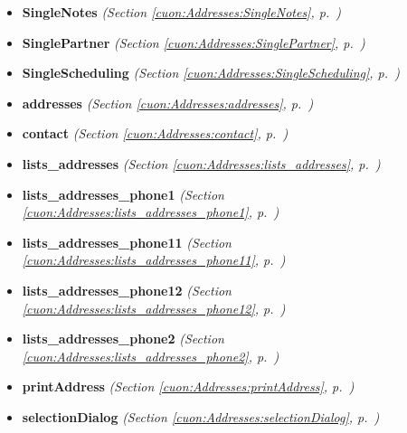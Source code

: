 \begin{itemize}
\begin{itemize}
    \item \textbf{SingleNotes}
  \textit{(Section \ref{cuon:Addresses:SingleNotes}, p.~\pageref{cuon:Addresses:SingleNotes})}

    \item \textbf{SinglePartner}
  \textit{(Section \ref{cuon:Addresses:SinglePartner}, p.~\pageref{cuon:Addresses:SinglePartner})}

    \item \textbf{SingleScheduling}
  \textit{(Section \ref{cuon:Addresses:SingleScheduling}, p.~\pageref{cuon:Addresses:SingleScheduling})}

    \item \textbf{addresses}
  \textit{(Section \ref{cuon:Addresses:addresses}, p.~\pageref{cuon:Addresses:addresses})}

    \item \textbf{contact}
  \textit{(Section \ref{cuon:Addresses:contact}, p.~\pageref{cuon:Addresses:contact})}

    \item \textbf{lists\_addresses}
  \textit{(Section \ref{cuon:Addresses:lists_addresses}, p.~\pageref{cuon:Addresses:lists_addresses})}

    \item \textbf{lists\_addresses\_phone1}
  \textit{(Section \ref{cuon:Addresses:lists_addresses_phone1}, p.~\pageref{cuon:Addresses:lists_addresses_phone1})}

    \item \textbf{lists\_addresses\_phone11}
  \textit{(Section \ref{cuon:Addresses:lists_addresses_phone11}, p.~\pageref{cuon:Addresses:lists_addresses_phone11})}

    \item \textbf{lists\_addresses\_phone12}
  \textit{(Section \ref{cuon:Addresses:lists_addresses_phone12}, p.~\pageref{cuon:Addresses:lists_addresses_phone12})}

    \item \textbf{lists\_addresses\_phone2}
  \textit{(Section \ref{cuon:Addresses:lists_addresses_phone2}, p.~\pageref{cuon:Addresses:lists_addresses_phone2})}

    \item \textbf{printAddress}
  \textit{(Section \ref{cuon:Addresses:printAddress}, p.~\pageref{cuon:Addresses:printAddress})}

    \item \textbf{selectionDialog}
  \textit{(Section \ref{cuon:Addresses:selectionDialog}, p.~\pageref{cuon:Addresses:selectionDialog})}


\end{itemize}
\end{itemize}
